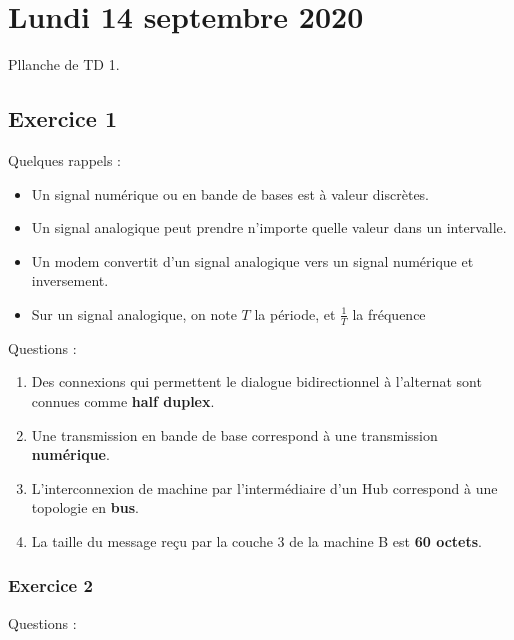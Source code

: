 \section{Lundi 14 septembre 2020}

Pllanche de TD 1.

\subsection{Exercice 1}

Quelques rappels :

\begin{itemize}
\tightlist
	\item Un signal numérique ou en bande de bases est à valeur discrètes.
	\item Un signal analogique peut prendre n'importe quelle valeur dans un intervalle.
	\item Un modem convertit d'un signal analogique vers un signal numérique et inversement.
	\item Sur un signal analogique, on note $T$ la période, et $\frac{1}{T}$ la fréquence
\end{itemize}

Questions :

\begin{enumerate}
\tightlist

	\item Des connexions qui permettent le dialogue bidirectionnel à l'alternat sont connues comme \textbf{half duplex}.
	\item Une transmission en bande de base correspond à une transmission \textbf{numérique}.
	\item L'interconnexion de machine par l'intermédiaire d'un Hub correspond à une topologie en \textbf{bus}.
	\item La taille du message reçu par la couche 3 de la machine B est \textbf{60 octets}.

\end{enumerate}

\subsubsection{Exercice 2}

Questions :

